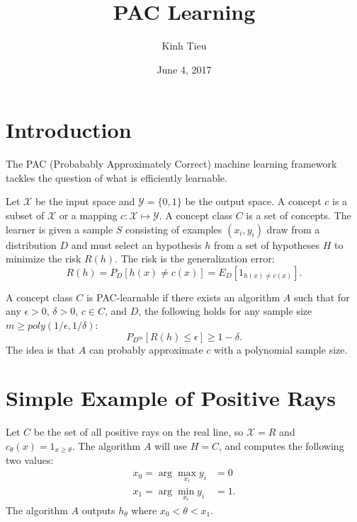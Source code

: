 \documentclass{article}
\begin{document}
\title{PAC Learning}
\author{Kinh Tieu}
\date{June 4, 2017}
\maketitle

\section{Introduction}

The PAC (Probabably Approximately Correct) machine learning framework tackles the question of what is efficiently learnable.

Let $\mathcal{X}$ be the input space and $\mathcal{Y} = \{0, 1\}$ be the output space.  A concept $c$ is a subset of $\mathcal{X}$ or a mapping $c: \mathcal{X} \mapsto \mathcal{Y}$.  A concept class $C$ is a set of concepts.  The learner is given a sample $S$ consisting of examples $(x_i, y_i)$ draw from a distribution $D$ and must select an hypothesis $h$ from a set of hypotheses $H$ to minimize the risk $R(h)$.  The risk is the generalization error:
$$ R(h) = P_D[h(x) \ne c(x)] = E_D[1_{h(x) \ne c(x)}]. $$

A concept class $C$ is PAC-learnable if there exists an algorithm $A$ such that for any $\epsilon > 0$, $\delta > 0$, $c \in C$, and $D$, the following holds for any sample size $m \ge poly(1/\epsilon, 1/\delta)$:
$$ P_{D^m}[R(h) \le \epsilon] \ge 1 - \delta. $$
The idea is that $A$ can probably approximate $c$ with a polynomial sample size.

\section{Simple Example of Positive Rays}

Let $C$ be the set of all positive rays on the real line, so $\mathcal{X} = R$ and $c_\theta(x) = 1_{x \ge \theta}$.  The algorithm $A$ will use $H = C$, and computes the following two values:
\begin{align*}
x_0 = \arg \max_{x_i} y_i &= 0 \\
x_1 = \arg \min_{x_i} y_i &= 1.
\end{align*}
The algorithm $A$ outputs $h_\theta$ where $x_0 < \theta < x_1$.

\end{document}
